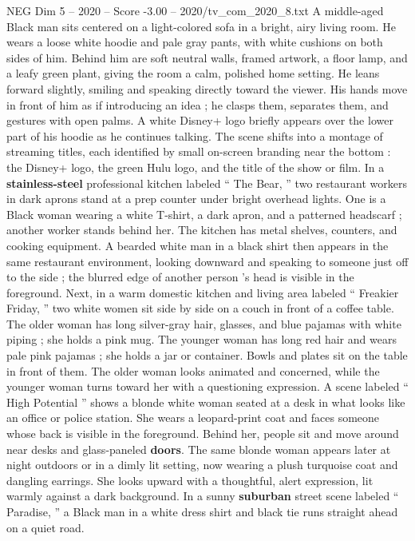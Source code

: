 \begin{textsample}{NEG Dim 5 – 2020 – Score -3.00 – 2020/tv\_com\_2020\_8.txt}  \label{ex:f5_neg_038}
A middle-aged Black man sits centered on a light-colored sofa in a bright, airy living room.
He wears a loose white hoodie and pale gray pants, with white cushions on both sides of him.
Behind him are soft neutral walls, framed artwork, a floor lamp, and a leafy green plant, giving the room a calm, polished home setting.
He leans forward slightly, smiling and speaking directly toward the viewer.
His hands move in front of him as if introducing an idea ; he clasps them, separates them, and gestures with open palms.
A white Disney+ logo briefly appears over the lower part of his hoodie as he continues talking.
The scene shifts into a montage of streaming titles, each identified by small on-screen branding near the bottom : the Disney+ logo, the green Hulu logo, and the title of the show or film.
In a \textbf{stainless-steel} professional kitchen labeled “ The Bear, ” two restaurant workers in dark aprons stand at a prep counter under bright overhead lights.
One is a Black woman wearing a white T-shirt, a dark apron, and a patterned headscarf ; another worker stands behind her.
The kitchen has metal shelves, counters, and cooking equipment.
A bearded white man in a black shirt then appears in the same restaurant environment, looking downward and speaking to someone just off to the side ; the blurred edge of another person ’s head is visible in the foreground.
Next, in a warm domestic kitchen and living area labeled “ Freakier Friday, ” two white women sit side by side on a couch in front of a coffee table.
The older woman has long silver-gray hair, glasses, and blue pajamas with white piping ; she holds a pink mug.
The younger woman has long red hair and wears pale pink pajamas ; she holds a jar or container.
Bowls and plates sit on the table in front of them.
The older woman looks animated and concerned, while the younger woman turns toward her with a questioning expression.
A scene labeled “ High Potential ” shows a blonde white woman seated at a desk in what looks like an office or police station.
She wears a leopard-print coat and faces someone whose back is visible in the foreground.
Behind her, people sit and move around near desks and glass-paneled \textbf{doors}.
The same blonde woman appears later at night outdoors or in a dimly lit setting, now wearing a plush turquoise coat and dangling earrings.
She looks upward with a thoughtful, alert expression, lit warmly against a dark background.
In a sunny \textbf{suburban} street scene labeled “ Paradise, ” a Black man in a white dress shirt and black tie runs straight ahead on a quiet road.

\end{textsample}
